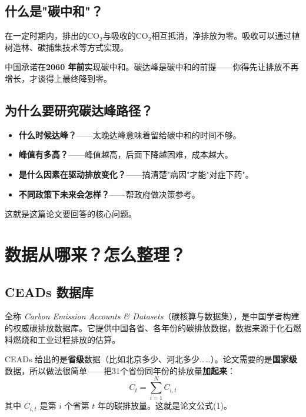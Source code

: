 \documentclass[12pt, a4paper]{article}
\begin{document}
\subsection{什么是"碳中和"？}

\begin{conceptbox}[碳中和]
在一定时期内，排出的CO$_2$与吸收的CO$_2$相互抵消，净排放为零。吸收可以通过植树造林、碳捕集技术等方式实现。
\end{conceptbox}

中国承诺在\textbf{2060 年前}实现碳中和。碳达峰是碳中和的前提——你得先让排放不再增长，才谈得上最终降到零。

\subsection{为什么要研究碳达峰路径？}

\begin{itemize}[leftmargin=2em]
\item \textbf{什么时候达峰？}——太晚达峰意味着留给碳中和的时间不够。
\item \textbf{峰值有多高？}——峰值越高，后面下降越困难，成本越大。
\item \textbf{是什么因素在驱动排放变化？}——搞清楚"病因"才能"对症下药"。
\item \textbf{不同政策下未来会怎样？}——帮政府做决策参考。
\end{itemize}

这就是这篇论文要回答的核心问题。

\section{数据从哪来？怎么整理？}

\subsection{CEADs 数据库}

\begin{conceptbox}[CEADs]
全称 \textit{Carbon Emission Accounts \& Datasets}（碳核算与数据集），是中国学者构建的权威碳排放数据库。它提供中国各省、各年份的碳排放数据，数据来源于化石燃料燃烧和工业过程排放的估算。
\end{conceptbox}

\begin{tipbox}
CEADs 给出的是\textbf{省级}数据（比如北京多少、河北多少……）。论文需要的是\textbf{国家级}数据，所以做法很简单——把31个省份同年份的排放量\textbf{加起来}：
\[
C_t = \sum_{i=1}^{N} C_{i,t}
\]
其中 $C_{i,t}$ 是第 $i$ 个省第 $t$ 年的碳排放量。这就是论文公式(1)。
\end{tipbox}
\end{document}
